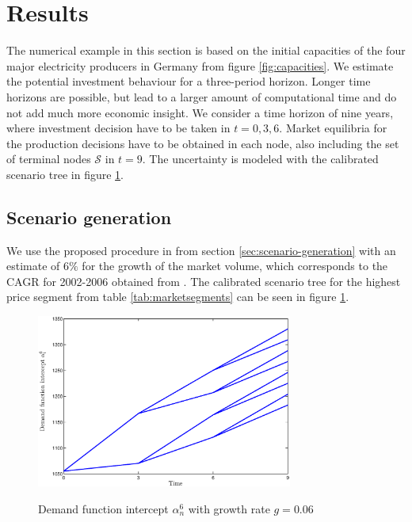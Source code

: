 \clearpage
\section{Results}
\label{sec:results}

The numerical example in this section is based on the initial capacities of the four major electricity producers in Germany from figure \ref{fig:capacities}. We estimate the potential investment behaviour for a three-period horizon. Longer time horizons are possible, but lead to a larger amount of computational time and do not add much more economic insight. We consider a time horizon of nine years, where investment decision have to be taken in $t=0,3,6$. Market equilibria for the production decisions have to be obtained in each node, also including the set of terminal nodes $\mathcal{S}$ in $t=9$.  The uncertainty is modeled with the calibrated scenario tree in figure \ref{fig:intercept}.

\subsection{Scenario generation}

We use the proposed procedure in from section \ref{sec:scenario-generation} with an estimate of $6\%$ for the growth of the market volume, which corresponds to the CAGR for 2002-2006 obtained from \cite{Datamonitor2007}. The calibrated scenario tree for the highest price segment from table \ref{tab:marketsegments} can be seen in figure \ref{fig:intercept}.

\begin{figure}[htb]
  \centering
\caption{Demand function intercept $\alpha_n^6$ with growth rate $g=0.06$}
  \includegraphics[width=0.75\textwidth]{numericalpaper/intercept}
  \label{fig:intercept}
\end{figure}

